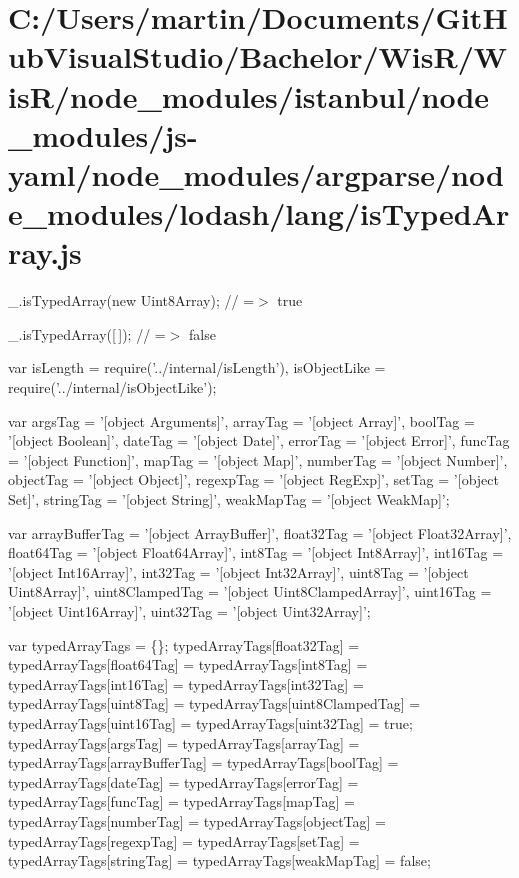 \hypertarget{_c_1_2_users_2martin_2_documents_2_git_hub_visual_studio_2_bachelor_2_wis_r_2_wis_r_2node_modulebfd5909c43962ad925f5661d0f1529db}{}\section{C\+:/\+Users/martin/\+Documents/\+Git\+Hub\+Visual\+Studio/\+Bachelor/\+Wis\+R/\+Wis\+R/node\+\_\+modules/istanbul/node\+\_\+modules/js-\/yaml/node\+\_\+modules/argparse/node\+\_\+modules/lodash/lang/is\+Typed\+Array.\+js}
\+\_\+.\+is\+Typed\+Array(new Uint8\+Array); // =$>$ true

\+\_\+.\+is\+Typed\+Array(\mbox{[}$\,$\mbox{]}); // =$>$ false


\begin{DoxyCodeInclude}
var isLength = require(\textcolor{stringliteral}{'../internal/isLength'}),
    isObjectLike = require(\textcolor{stringliteral}{'../internal/isObjectLike'});

var argsTag = \textcolor{stringliteral}{'[object Arguments]'},
    arrayTag = \textcolor{stringliteral}{'[object Array]'},
    boolTag = \textcolor{stringliteral}{'[object Boolean]'},
    dateTag = \textcolor{stringliteral}{'[object Date]'},
    errorTag = \textcolor{stringliteral}{'[object Error]'},
    funcTag = \textcolor{stringliteral}{'[object Function]'},
    mapTag = \textcolor{stringliteral}{'[object Map]'},
    numberTag = \textcolor{stringliteral}{'[object Number]'},
    objectTag = \textcolor{stringliteral}{'[object Object]'},
    regexpTag = \textcolor{stringliteral}{'[object RegExp]'},
    setTag = \textcolor{stringliteral}{'[object Set]'},
    stringTag = \textcolor{stringliteral}{'[object String]'},
    weakMapTag = \textcolor{stringliteral}{'[object WeakMap]'};

var arrayBufferTag = \textcolor{stringliteral}{'[object ArrayBuffer]'},
    float32Tag = \textcolor{stringliteral}{'[object Float32Array]'},
    float64Tag = \textcolor{stringliteral}{'[object Float64Array]'},
    int8Tag = \textcolor{stringliteral}{'[object Int8Array]'},
    int16Tag = \textcolor{stringliteral}{'[object Int16Array]'},
    int32Tag = \textcolor{stringliteral}{'[object Int32Array]'},
    uint8Tag = \textcolor{stringliteral}{'[object Uint8Array]'},
    uint8ClampedTag = \textcolor{stringliteral}{'[object Uint8ClampedArray]'},
    uint16Tag = \textcolor{stringliteral}{'[object Uint16Array]'},
    uint32Tag = \textcolor{stringliteral}{'[object Uint32Array]'};

var typedArrayTags = \{\};
typedArrayTags[float32Tag] = typedArrayTags[float64Tag] =
typedArrayTags[int8Tag] = typedArrayTags[int16Tag] =
typedArrayTags[int32Tag] = typedArrayTags[uint8Tag] =
typedArrayTags[uint8ClampedTag] = typedArrayTags[uint16Tag] =
typedArrayTags[uint32Tag] = \textcolor{keyword}{true};
typedArrayTags[argsTag] = typedArrayTags[arrayTag] =
typedArrayTags[arrayBufferTag] = typedArrayTags[boolTag] =
typedArrayTags[dateTag] = typedArrayTags[errorTag] =
typedArrayTags[funcTag] = typedArrayTags[mapTag] =
typedArrayTags[numberTag] = typedArrayTags[objectTag] =
typedArrayTags[regexpTag] = typedArrayTags[setTag] =
typedArrayTags[stringTag] = typedArrayTags[weakMapTag] = \textcolor{keyword}{false};


\end{DoxyCodeInclude}
